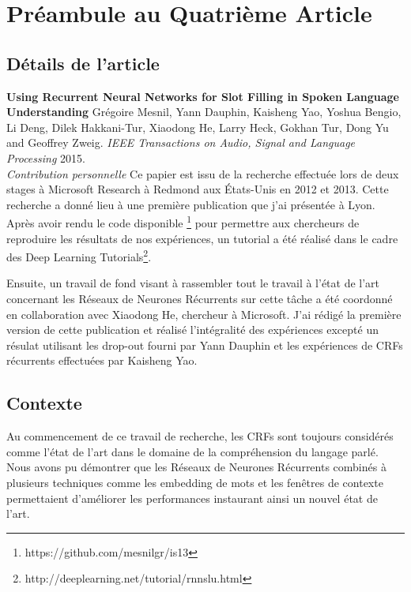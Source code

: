 \chapter{Pr\'{e}ambule au Quatri\`{e}me Article }

\section{D\'{e}tails de l'article}

{\bf Using Recurrent Neural Networks for Slot Filling in Spoken Language
Understanding} Grégoire Mesnil, Yann Dauphin, Kaisheng Yao, Yoshua Bengio, Li
Deng, Dilek Hakkani-Tur, Xiaodong He, Larry Heck, Gokhan Tur, Dong Yu and
Geoffrey Zweig. {\it IEEE Transactions on Audio, Signal and Language
Processing} 2015. \\

{\it Contribution personnelle} Ce papier est issu de la recherche effectuée
lors de deux stages à Microsoft Research à Redmond aux États-Unis en 2012 et
2013. Cette recherche a donné lieu à une première publication
\citep{mesnil-et-al-Interspeech2013} que j'ai présentée à Lyon. Après avoir
rendu le code disponible \footnote{https://github.com/mesnilgr/is13} pour
permettre aux chercheurs de reproduire les résultats de nos expériences, un
tutorial a été réalisé dans le cadre des Deep Learning
Tutorials\footnote{http://deeplearning.net/tutorial/rnnslu.html}.

Ensuite, un travail de fond visant à rassembler tout le travail à l'état de
l'art concernant les Réseaux de Neurones Récurrents sur cette tâche a été
coordonné en collaboration avec Xiaodong He, chercheur à Microsoft. J'ai rédigé
la première version de cette publication et réalisé l'intégralité des
expériences excepté un résulat utilisant les drop-out fourni par Yann Dauphin
et les expériences de CRFs récurrents effectuées par Kaisheng Yao. 

\section{Contexte}

Au commencement de ce travail de recherche, les CRFs sont toujours considérés
comme l'état de l'art dans le domaine de la compréhension du langage parlé.
Nous avons pu démontrer que les Réseaux de Neurones Récurrents combinés à
plusieurs techniques comme les embedding de mots et les fenêtres de contexte
permettaient d'améliorer les performances instaurant ainsi un nouvel état de
l'art.

